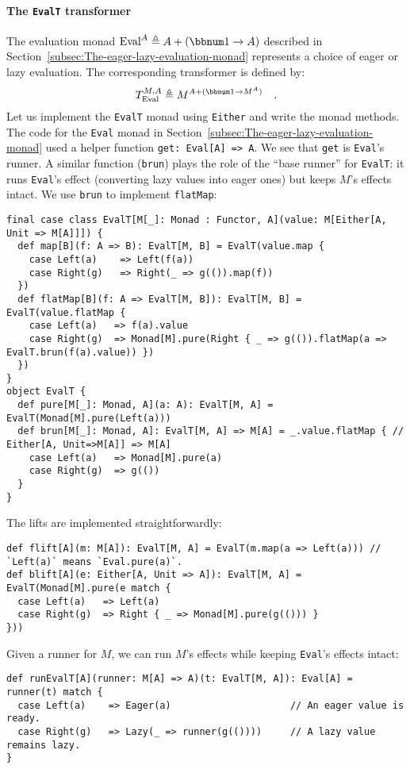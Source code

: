 \paragraph{The \texttt{EvalT} transformer}

The evaluation monad $\text{Eval}^{A}\triangleq A+\left(\bbnum 1\rightarrow A\right)$
described in Section~\ref{subsec:The-eager-lazy-evaluation-monad}
represents a choice of eager or lazy evaluation. The corresponding
transformer is defined by:
\[
T_{\text{Eval}}^{M,A}\triangleq M^{A+(\bbnum 1\rightarrow M^{A})}\quad.
\]
Let us implement the \lstinline!EvalT! monad using \lstinline!Either!
and write the monad methods. The code for the \lstinline!Eval! monad
in Section~\ref{subsec:The-eager-lazy-evaluation-monad} used a helper
function \lstinline!get: Eval[A] => A!. We see that \lstinline!get!
is \lstinline!Eval!\textsf{'}s runner. A similar function (\lstinline!brun!)
plays the role of the \textsf{``}base runner\textsf{''} for \lstinline!EvalT!: it
runs \lstinline!Eval!\textsf{'}s effect (converting lazy values into eager
ones) but keeps $M$\textsf{'}s effects intact. We use \lstinline!brun! to
implement \lstinline!flatMap!:
\begin{lstlisting}
final case class EvalT[M[_]: Monad : Functor, A](value: M[Either[A, Unit => M[A]]]) {
  def map[B](f: A => B): EvalT[M, B] = EvalT(value.map {
    case Left(a)    => Left(f(a))
    case Right(g)   => Right(_ => g(()).map(f))
  })
  def flatMap[B](f: A => EvalT[M, B]): EvalT[M, B] = EvalT(value.flatMap {
    case Left(a)   => f(a).value
    case Right(g)  => Monad[M].pure(Right { _ => g(()).flatMap(a => EvalT.brun(f(a).value)) })
  })
}
object EvalT {
  def pure[M[_]: Monad, A](a: A): EvalT[M, A] = EvalT(Monad[M].pure(Left(a)))
  def brun[M[_]: Monad, A]: EvalT[M, A] => M[A] = _.value.flatMap { // Either[A, Unit=>M[A]] => M[A]
    case Left(a)   => Monad[M].pure(a)
    case Right(g)  => g(())
  }
}
\end{lstlisting}

The lifts are implemented straightforwardly:
\begin{lstlisting}
def flift[A](m: M[A]): EvalT[M, A] = EvalT(m.map(a => Left(a))) // `Left(a)` means `Eval.pure(a)`.
def blift[A](e: Either[A, Unit => A]): EvalT[M, A] = EvalT(Monad[M].pure(e match {
  case Left(a)   => Left(a)
  case Right(g)  => Right { _ => Monad[M].pure(g(())) } 
}))
\end{lstlisting}

Given a runner for $M$, we can run $M$\textsf{'}s effects while keeping \lstinline!Eval!\textsf{'}s
effects intact:
\begin{lstlisting}
def runEvalT[A](runner: M[A] => A)(t: EvalT[M, A]): Eval[A] = runner(t) match {
  case Left(a)    => Eager(a)                     // An eager value is ready.
  case Right(g)   => Lazy(_ => runner(g(())))     // A lazy value remains lazy.
}
\end{lstlisting}


